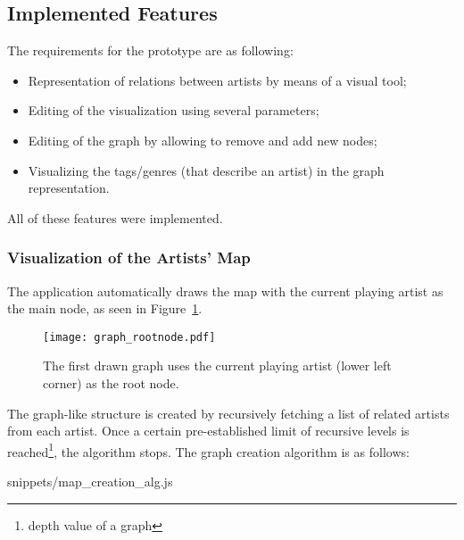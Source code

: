  \subsection{Implemented Features} %
    \label{sub:main_features}
    
    The requirements for the prototype are as following:

    \begin{itemize}
      \item Representation of relations between artists by means of a visual tool;
      \item Editing of the visualization using several parameters;
      \item Editing of the graph by allowing to remove and add new nodes;
      \item Visualizing the tags/genres (that describe an artist) in the graph representation.
    \end{itemize}

    All of these features were implemented.

    \subsubsection{Visualization of the Artists' Map} %
      \label{ssub:visualization}
    
      The application automatically draws the map with the current playing artist as the main node, as seen in Figure~\ref{fig:graph_rootnode}.

      \begin{figure}[H]
        \begin{center}
          \texttt{[image: graph\_rootnode.pdf]}
        \end{center}
        \caption{The first drawn graph uses the current playing artist (lower left corner) as the root node.}
        \label{fig:graph_rootnode}
      \end{figure}

      The graph-like structure is created by recursively fetching a list of related artists from each artist. Once a certain pre-established limit of recursive levels is reached\footnote{depth value of a graph}, the algorithm stops.
      The graph creation algorithm is as follows:

      
      {snippets/map_creation_alg.js}

